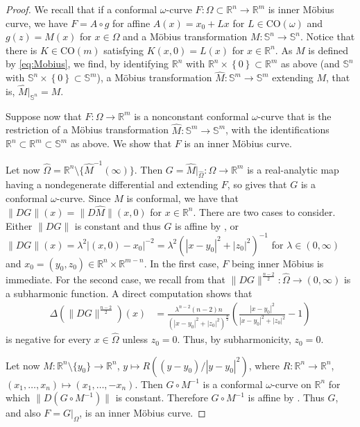 \documentclass[a4paper,leqno,11pt]{amsart}
\numberwithin{equation}{section}
\theoremstyle{remark}
\theoremstyle{remark}
\renewcommand{\S}{\mathbb{S}}
\newcommand{\R}{\mathbb{R}}
\newcommand{\CO}{\mathrm{CO}}
\begin{document}
\begin{proof}
We recall that if a conformal $\omega$-curve $F \colon \Omega \subset \R^n \to \R^m$ is inner Möbius curve, we have $F = A \circ g$ for affine $A(x) = x_0 + Lx$ for $L \in \CO( \omega )$ and $g(z) = M(x)$ for $x \in \Omega$ and a Möbius transformation $M \colon \S^n \to \S^n$. Notice that there is $K \in \CO(m)$ satisfying $K( x, 0 ) = L( x )$ for $x \in \R^n$. As $M$ is defined by \eqref{eq:Mobius}, we find, by identifying $\R^n$ with $\R^n \times \left\{0\right\} \subset \R^m$ as above (and $\S^n$ with $\S^n \times \left\{0\right\} \subset \S^m$), a Möbius transformation $\widehat{M} \colon \S^m \to \S^m$ extending $M$, that is, $\widehat{M}|_{ \S^n } = M$.

Suppose now that $F \colon \Omega \to \R^m$ is a nonconstant conformal $\omega$-curve that is the restriction of a Möbius transformation $\widehat{M} \colon \S^m \to \S^m$, with the identifications $\R^n \subset \R^m \subset \S^m$ as above. We show that $F$ is an inner Möbius curve. 

Let now $\widehat{\Omega} = \R^n \setminus \{ \widehat{M}^{-1}(\infty) \}$. Then $G = \widehat{M}|_{ \widehat{\Omega} } \colon \widehat{\Omega} \to \R^m$ is a real-analytic map having a nondegenerate differential and extending $F$, so  gives that $G$ is a conformal $\omega$-curve. Since $\widehat{M}$ is conformal, we have that $\| DG \|(x) = \| D\widehat{M} \|( x, 0 )$ for $x \in \R^n$. There are two cases to consider. Either $\|DG\|$ is constant and thus $G$ is affine by , or $\|DG\|(x) = \lambda^2 | (x,0) - x_0 |^{-2} = \lambda^2 ( |x-y_0|^2 + |z_0|^2 )^{-1}$ for $\lambda \in (0,\infty)$ and $x_0 = ( y_0, z_0 ) \in \R^n \times \R^{m-n}$. In the first case, $F$ being inner Möbius is immediate. For the second case, we recall from  that $\|DG\|^{ \frac{n-2}{2} } \colon \widehat{\Omega} \to (0,\infty)$ is a subharmonic function. A direct computation shows that
\begin{align*}
    \Delta( \|DG\|^{ \frac{n-2}{2} } )(x)
    &=
    \frac{ \lambda^{ n - 2 }( n - 2 ) n }{ \left( |x-y_0|^2 + |z_0|^2 \right)^{ \frac{n}{2} }  }
    \left(
        \frac{ |x-y_0|^2 }{ |x-y_0|^2 + |z_0|^2 } - 1
    \right)
\end{align*}
is negative for every $x \in \widehat{\Omega}$ unless $z_0 = 0$. Thus, by subharmonicity, $z_0 = 0$.

Let now $M \colon \R^n\setminus \{y_0\} \to \R^n$, $y \mapsto R( (y-y_0)/|y-y_0|^2 )$, where $R \colon \R^n \to \R^n$, $(x_1,\ldots, x_n) \mapsto (x_1,\ldots, -x_n)$. Then $G \circ M^{-1}$ is a conformal $\omega$-curve on $\R^n$ for which $\|D( G \circ M^{-1} ) \|$ is constant. Therefore $G \circ M^{-1}$ is affine by . Thus $G$, and also $F = G|_{ \Omega }$, is an inner Möbius curve. 
\end{proof}
\end{document}
